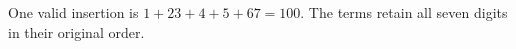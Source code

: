 One valid insertion is $\boxed{1+23+4+5+67=100}$. The terms retain all seven digits in their original order.
